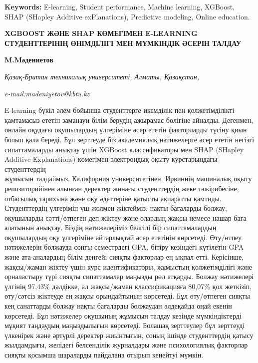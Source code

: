{\bfseries Keywords:} E-learning, Student performance, Machine learning,
XGBoost, SHAP (SHapley Additive exPlanations), Predictive modeling,
Online education.

\begin{articleheader}
{\bfseries XGBOOST ЖӘНЕ SHAP КӨМЕГІМЕН E-LEARNING СТУДЕНТТЕРІНІҢ ӨНІМДІЛІГІ МЕН МҮМКІНДІК ӘСЕРІН ТАЛДАУ}

{\bfseries M.Mәдениетов}
\end{articleheader}

\begin{affiliation}
\emph{Қазақ-Британ техникалық университеті, Алматы, Қазақстан,}

\emph{e-mail:madeniyetov@kbtu.kz}
\end{affiliation}

E-learning бүкіл әлем бойынша студенттерге икемділік пен қолжетімділікті
қамтамасыз ететін заманауи білім берудің ажырамас бөлігіне айналды.
Дегенмен, онлайн оқудағы оқушылардың үлгеріміне әсер ететін факторларды
түсіну қиын болып қала береді. Бұл зерттеуде біз академиялық нәтижелерге
әсер ететін негізгі сипаттамаларды анықтау үшін XGBoost классификаторы
мен SHAP (SHapley Additive Explanations) көмегімен электрондық оқыту
курстарындағы студенттердің \\жұмысын талдаймыз. Калифорния
университетінен, Ирвиннің машиналық оқыту репозиторийінен алынған
деректер жинағы студенттердің жеке тәжірибесіне, отбасылық тарихына және
оқу әдеттеріне қатысты ақпаратты қамтиды. Студенттердің үлгерімін үш
жолмен жіктейміз: нақты бағаларды болжау, оқушыларды сәтті/өтпеген деп
жіктеу және олардың жақсы немесе нашар баға алатынын анықтау. Біздің
нәтижелеріміз белгілі бір сипаттамалардың оқушылардың оқу үлгеріміне
айтарлықтай әсер ететінін көрсетеді. Өту/өтпеу нәтижелерін болжауда
соңғы семестрдегі GPA, бітіру кезіндегі күтілетін GPA және ата-аналардың
білім деңгейі сияқты факторлар ең ықпал етті. Керісінше, жақсы/жаман
жіктеу үшін курс идентификаторы, жұмыстың қолжетімділігі және
орналастыру түрі сияқты сипаттамалар маңызды рөл атқарды. Болжау
нәтижелері үлгінің 97,43\% дәлдікке, ал жақсы/жаман классификацияға
80,07\% қол жеткізіп, өту/сәтсіз жіктеуде ең жақсы орындайтынын
көрсетеді. Бұл өту/өтпеген сияқты кең санаттарды болжау нақты бағаларды
болжаудан әлдеқайда оңай екенін көрсетеді. Бұл нәтижелер оқушының
жұмысын талдау кезінде мүмкіндіктерді мұқият таңдаудың маңыздылығын
көрсетеді. Болашақ зерттеулер бұл зерттеуді үлкенірек және әртүрлі
деректер жиынтығын, соның ішінде студенттердің қатысу жылдамдығы,
желідегі белсенділік журналдары және психологиялық факторлар сияқты
қосымша шараларды пайдалана отырып кеңейтуі мүмкін.

